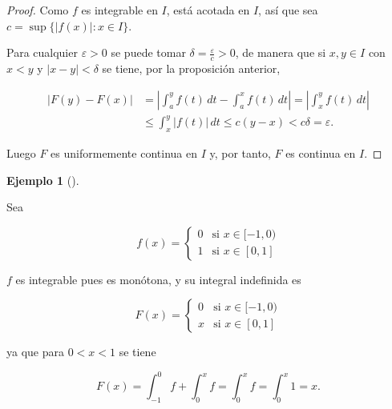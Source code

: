 \documentclass[
  a4paper,
]{scrreport}
\theoremstyle{definition}
\newtheorem{example}{Ejemplo}[chapter]
\theoremstyle{plain}
\theoremstyle{definition}
\theoremstyle{definition}
\theoremstyle{plain}
\theoremstyle{plain}
\theoremstyle{remark}
\begin{document}
\begin{tcolorbox}[enhanced jigsaw, leftrule=.75mm, colbacktitle=quarto-callout-note-color!10!white, toprule=.15mm, opacityback=0, opacitybacktitle=0.6, toptitle=1mm, breakable, bottomtitle=1mm, colframe=quarto-callout-note-color-frame, rightrule=.15mm, titlerule=0mm, title=\textcolor{quarto-callout-note-color}{\faInfo}\hspace{0.5em}{Demostración}, arc=.35mm, left=2mm, bottomrule=.15mm, colback=white, coltitle=black]

\begin{proof}
Como \(f\) es integrable en \(I\), está acotada en \(I\), así que sea
\(c=\sup\{|f(x)|: x\in I\}\).

Para cualquier \(\varepsilon>0\) se puede tomar
\(\delta =\frac{\varepsilon}{c}>0\), de manera que si \(x,y\in I\) con
\(x<y\) y \(|x-y|<\delta\) se tiene, por la proposición anterior,

\begin{align*}
|F(y)-F(x)| 
& = \left|\int_a^y f(t)\,dt -\int_a^x f(t)\,dt\right| = \left|\int_x^y f(t)\,dt \right| \\
& \leq \int_x^y |f(t)|\,dt \leq c(y-x) < c\delta  = \varepsilon.
\end{align*}

Luego \(F\) es uniformemente continua en \(I\) y, por tanto, \(F\) es
continua en \(I\).
\end{proof}

\end{tcolorbox}

\begin{example}[]\protect\hypertarget{exm-integral-indefinida-continua}{}\label{exm-integral-indefinida-continua}

Sea

\[
f(x)=
\begin{cases}
0 & \mbox{si $x\in [-1,0)$}\\
1 & \mbox{si $x\in [0,1]$}
\end{cases}
\]

\(f\) es integrable pues es monótona, y su integral indefinida es

\[
F(x) = 
\begin{cases}
0 & \mbox{si $x\in [-1,0)$}\\
x & \mbox{si $x\in [0,1]$}
\end{cases}
\]

ya que para \(0<x<1\) se tiene

\[
F(x) = \int_{-1}^0 f + \int_0^x f = \int_0^x f = \int_0^x 1 = x.
\]

\end{example}
\end{document}
